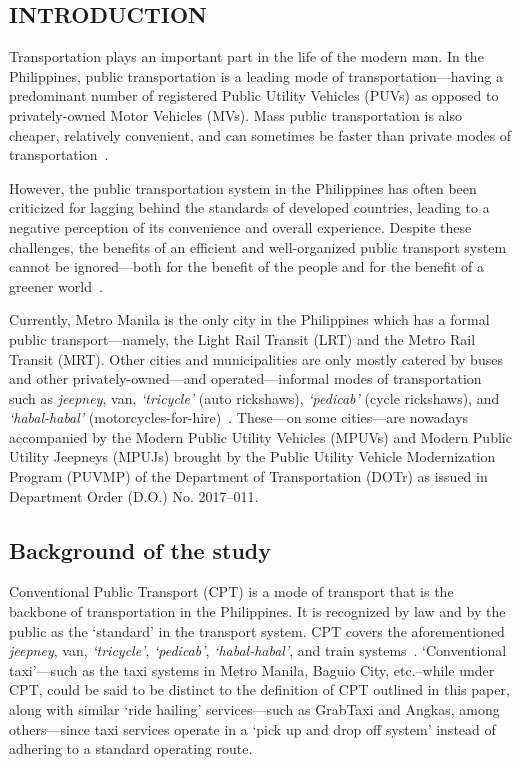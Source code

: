 \documentclass{icsthesis}
\begin{document}
	\begin{mainmatter}
		\section{INTRODUCTION}
            Transportation plays an important part in the life of the modern man. In the Philippines, public transportation is a leading mode of transportation---having a predominant number of registered Public Utility Vehicles (PUVs) as opposed to privately-owned Motor Vehicles (MVs).
Mass public transportation is also cheaper, relatively convenient, and can sometimes be faster than private modes of transportation~\citep{Narboneta16}.

However, the public transportation system in the Philippines has often been criticized for lagging behind the standards of developed countries, leading to a negative perception of its convenience and overall experience. Despite these challenges, the benefits of an efficient and well-organized public transport system cannot be ignored---both for the benefit of the people and for the benefit of a greener world~\citep{Lagua19}.

Currently, Metro Manila is the only city in the Philippines which has a formal public transport---namely, the Light Rail Transit (LRT) and the Metro Rail Transit (MRT). Other cities and municipalities are only mostly catered by buses and other privately-owned---and operated---informal modes of transportation such as \textit{jeepney}, van, \textit{`tricycle'} (auto rickshaws), \textit{`pedicab'} (cycle rickshaws), and \textit{`habal-habal'} (motorcycles-for-hire)~\citep{Mayo20}.
These---on some cities---are nowadays accompanied by the Modern Public Utility Vehicles (MPUVs) and Modern Public Utility Jeepneys (MPUJs) brought by the Public Utility Vehicle Modernization Program (PUVMP) of the Department of Transportation (DOTr) as issued in Department Order (D.O.) No. 2017--011. %


\newpage

\subsection{Background of the study}
Conventional Public Transport (CPT) is a mode of transport that is the backbone of transportation in the Philippines. It is recognized by law and by the public as the `standard' in the transport system. CPT covers the aforementioned \textit{jeepney}, van, \textit{`tricycle'}, \textit{`pedicab'}, \textit{`habal-habal'}, and train systems~\citep{RamizoJr19}.
`Conventional taxi'---such as the taxi systems in Metro Manila, Baguio City, etc.\---while under CPT, could be said to be distinct to the definition of CPT outlined in this paper, along with similar `ride hailing' services---such as GrabTaxi and Angkas, among others---since taxi services operate in a `pick up and drop off system' instead of adhering to a standard operating route.


\end{mainmatter}
\end{document}
